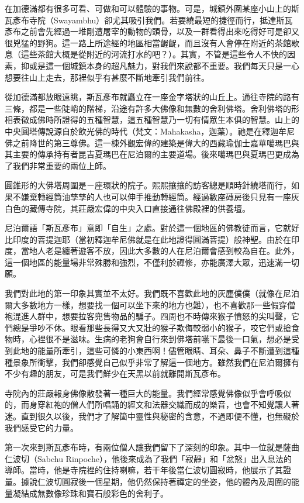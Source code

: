 在加德滿都有很多可看、可做和可以體驗的事物。可是，城鎮外圍某座小山上的斯瓦彥布寺院（Swayambhu）卻尤其吸引我們。若要繞最短的捷徑而行，抵達斯瓦彥布之前會先經過一堆剛遭屠宰的動物的頭骨，以及一群看得出來吃得好可是卻又很兇猛的野狗。這一路上所途經的地區相當齷齪，而且沒有人會停在附近的茶館歇息（這些茶館大概是從附近的河流打水的吧？）。其實，不管是這些令人不快的因素，抑或是這一個城鎮本身的超凡魅力，對我們來說都不重要。我們每天只是一心想要往山上走去，那裡似乎有甚麼不斷地牽引我們前往。

從加德滿都放眼遠眺，斯瓦彥布就矗立在一座金字塔狀的山丘上。通往寺院的路有三條，都是一些陡峭的階梯，沿途有許多大佛像和無數的舍利佛塔。舍利佛塔的形相表徵成佛時所證得的五種智慧，這五種智慧乃一切有情眾生本俱的智慧。山上的中央圓塔傳說源自於飲光佛的時代（梵文：Mahakasha，迦葉）。祂是在釋迦牟尼佛之前降世的第三尊佛。這一棟外觀宏偉的建築是偉大的西藏瑜伽士嘉華噶瑪巴與其主要的傳承持有者昆吉夏瑪巴在尼泊爾的主要道場。後來噶瑪巴與夏瑪巴更成為了我們非常重要的兩位上師。

圓錐形的大佛塔周圍是ㄧ座環狀的院子。熙熙攘攘的訪客總是順時針繞塔而行，如果不嫌棄轉經筒油孳孳的人也可以伸手推動轉經筒。經過數座磚房後只見有一座灰白色的藏傳寺院，其莊嚴宏偉的中央入口直接通往佛殿裡的供養壇。

尼泊爾語「斯瓦彥布」意即「自生」之處。對於這一個地區的佛教徒而言，它就好比印度的菩提迦耶（當初釋迦牟尼佛就是在此地證得圓滿菩提）般神聖。由於在印度，當地人老是纏著遊客不放，因此大多數的人在尼泊爾會感到較為自在。此外，這一個地區的能量場非常殊勝和強烈，不僅利於禪修，亦能廣澤大眾，迅速滿一切願。

我們對此地的第一印象其實並不太好。我們既不喜歡此地的灰塵僕僕（就像在尼泊爾大多數地方一樣，想要找一個可以坐下來的地方也難），也不喜歡那一些假穿僧袍混進人群中，想要拉客兜售物品的騙子。四周也不時傳來猴子憤怒的尖叫聲，它們總是爭吵不休。眼看那些長得又大又壯的猴子欺侮較弱小的猴子，咬它們或搶食物時，心裡很不是滋味。生病的老狗會自行來到佛塔前嚥下最後一口氣，想必是受到此地的能量所牽引，這些可憐的小東西啊！儘管眼睛、耳朵、鼻子不斷遭到這種種景象所衝擊，我們卻感覺自己似乎非常了解這一個地方。雖然我們在尼泊爾擁有不少有趣的朋友，可是我們鮮少在天黑以前就離開斯瓦彥布。

寺院內的莊嚴報身佛像散發著一種巨大的能量。我們經常感覺佛像似乎會呼吸似的，而身穿紅袍的僧人們所唱誦的經文和法器交織而成的樂音，也會不知覺讓人著迷。直到很久以後，我們才了解箇中靈性與秘密的含意，不過即便不懂，也無礙於我們感受它的力量。

第一次來到斯瓦彥布時，有兩位僧人讓我們留下了深刻的印象。其中一位就是薩曲仁波切（Sabchu
Rinpoche），他後來成為了我們「寂靜」和「忿怒」出入息法的導師。當時，他是寺院裡的住持喇嘛，若干年後當仁波切圓寂時，他展示了其證量。據說仁波切圓寂後一個星期，他仍然保持著禪定的坐姿，他的體內及周圍的能量凝結成無數像珍珠和寶石般彩色的舍利子。

